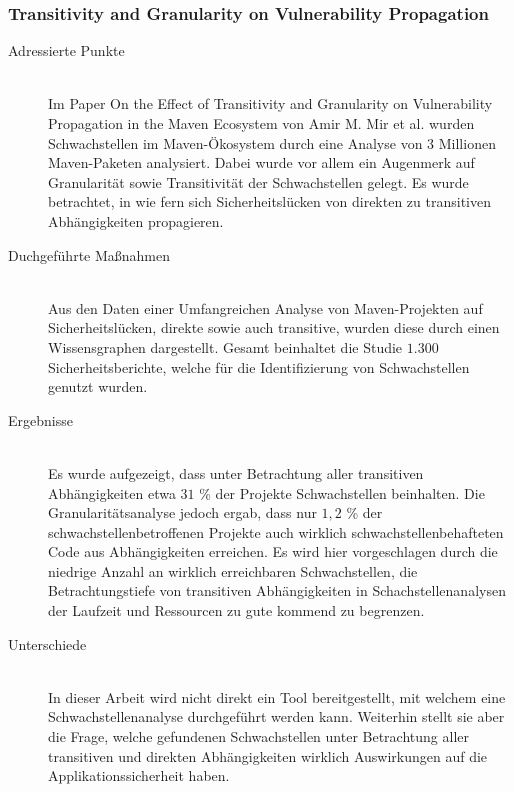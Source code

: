 \subsubsection{Transitivity and Granularity on Vulnerability Propagation} \label{sec:Transitivity}
    \begin{description}
        \item[Adressierte Punkte]\hfill \\
            Im Paper \glqq On the Effect of Transitivity and Granularity on Vulnerability Propagation in the Maven Ecosystem\grqq\cite{article:OnTheEffect10123571} von Amir M. Mir et al. wurden Schwachstellen im Maven-Ökosystem durch eine Analyse von $3$ Millionen Maven-Paketen analysiert.
            Dabei wurde vor allem ein Augenmerk auf Granularität sowie Transitivität der Schwachstellen gelegt.
            Es wurde betrachtet, in wie fern sich Sicherheitslücken von direkten zu transitiven Abhängigkeiten propagieren.
        \item[Duchgeführte Maßnahmen]\hfill \\
            Aus den Daten einer Umfangreichen Analyse von Maven-Projekten auf Sicherheitslücken, direkte sowie auch transitive, wurden diese durch einen Wissensgraphen dargestellt.
            Gesamt beinhaltet die Studie $1.300$ Sicherheitsberichte, welche für die Identifizierung von Schwachstellen genutzt wurden.
        \item[Ergebnisse]\hfill \\
            Es wurde aufgezeigt, dass unter Betrachtung aller transitiven Abhängigkeiten etwa $31$ \% der Projekte Schwachstellen beinhalten.
            Die Granularitätsanalyse jedoch ergab, dass nur $1,2$ \% der schwachstellenbetroffenen Projekte auch wirklich schwachstellenbehafteten Code aus Abhängig\-keiten erreichen.
            Es wird hier vorgeschlagen durch die niedrige Anzahl an wirklich erreichbaren Schwachstellen, die Betrachtungstiefe von transitiven Abhängigkeiten in Schachstellenanalysen der Laufzeit und Ressourcen zu gute kommend zu begrenzen.
        \item[Unterschiede]\hfill \\
            In dieser Arbeit wird nicht direkt ein Tool bereitgestellt, mit welchem eine Schwachstellenanalyse durchgeführt werden kann.
            Weiterhin stellt sie aber die Frage, welche gefundenen Schwachstellen unter Betrachtung aller transitiven und direkten Abhängigkeiten wirklich Auswirkungen auf die Applikationssicherheit haben.
    \end{description}